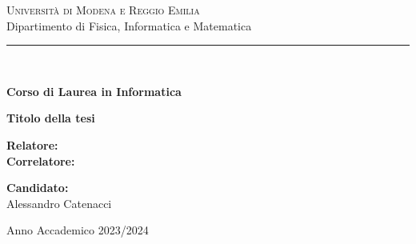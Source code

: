 \begin{titlepage}

\centering %
{\scshape\Large Università di Modena e Reggio Emilia\\[5mm]} %
{\Large Dipartimento di Fisica, Informatica e Matematica\\}
\rule{145mm}{0.1mm}\\[6mm] %

\begin{spacing}{1.8}
{\large\textbf{Corso di Laurea in Informatica}}
\end{spacing}
\vspace{30mm}

\begin{spacing}{2.0}
{\Large\bfseries Titolo della tesi}\\
\end{spacing}

\vspace{32mm}
\large %
\noindent
\begin{minipage}[t]{0.5\textwidth}
\textbf{Relatore:}\\[10pt] %
\textbf{Correlatore:}
\end{minipage}%
\hfill%
\begin{minipage}[t]{0.5\textwidth}\raggedleft
\textbf{Candidato:}\\
Alessandro Catenacci
\end{minipage}

\vfill %

{\large Anno Accademico 2023/2024} %

\end{titlepage}
\restoregeometry
